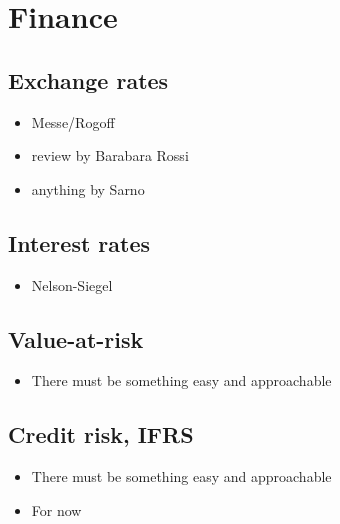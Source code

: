 \documentclass[letterpaper,10pt,english]{sphinxmanual}
\begin{document}
\section{Finance}
\label{\detokenize{applications:finance}}

\subsection{Exchange rates}
\label{\detokenize{applications:exchange-rates}}\begin{itemize}
\item {} 
Messe/Rogoff

\item {} 
review by Barabara Rossi

\item {} 
anything by Sarno

\end{itemize}


\subsection{Interest rates}
\label{\detokenize{applications:interest-rates}}\begin{itemize}
\item {} 
Nelson-Siegel

\end{itemize}


\subsection{Value-at-risk}
\label{\detokenize{applications:value-at-risk}}\begin{itemize}
\item {} 
There must be something easy and approachable

\end{itemize}


\subsection{Credit risk, IFRS}
\label{\detokenize{applications:credit-risk-ifrs}}\begin{itemize}
\item {} 
There must be something easy and approachable

\item {} 
For now 

\end{itemize}
\end{document}
